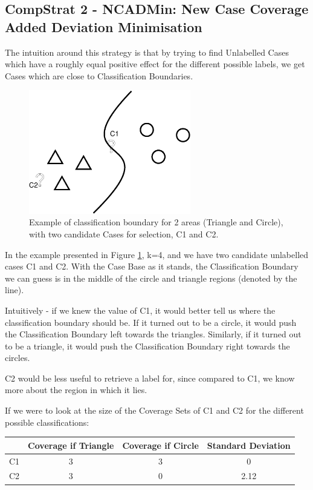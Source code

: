 \documentclass[a4paper,11pt]{report}
\begin{document}
\subsection{CompStrat 2 - NCADMin: New Case Coverage Added Deviation Minimisation}

The intuition around this strategy is that by trying to find Unlabelled Cases which have a roughly equal positive effect for the different possible labels, we get Cases which are close to Classification Boundaries.

\begin{figure}[h!] \centering
\includegraphics[width=200pt]{./Drawn/NCADMin}
\caption{Example of classification boundary for 2 areas (Triangle and Circle), with two candidate Cases for selection, C1 and C2.}
\label{fig:ncadmin}
\end{figure}

In the example presented in Figure \ref{fig:ncadmin}, k=4, and we have two candidate unlabelled cases C1 and C2. With the Case Base as it stands, the Classification Boundary we can guess is in the middle of the circle and triangle regions (denoted by the line).
 
Intuitively - if we knew the value of C1, it would better tell us where the classification boundary should be. If it turned out to be a circle, it would push the Classification Boundary left towards the triangles. Similarly, if it turned out to be a triangle, it would push the Classification Boundary right towards the circles. 

C2 would be less useful to retrieve a label for, since compared to C1, we know more about the region in which it lies.

If we were to look at the size of the Coverage Sets of C1 and C2 for the different possible classifications:

\begin{tabular}{|c|c|c|c|}
\cline{2-4} 
\multicolumn{1}{c|}{} & Coverage if Triangle & Coverage if Circle & Standard Deviation\tabularnewline
\hline 
C1 & 3 & 3 & 0\tabularnewline
\hline 
C2 & 3 & 0 & 2.12\tabularnewline
\hline 
\end{tabular}
\end{document}
